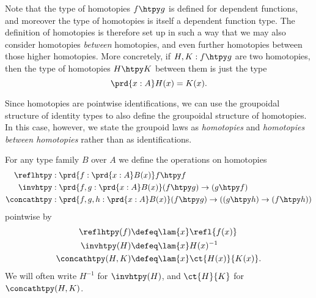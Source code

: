 Note that the type of homotopies $f\htpy g$ is defined for dependent functions, and moreover the type of homotopies is itself a dependent function type. The definition of homotopies is therefore set up in such a way that we may also consider homotopies \emph{between} homotopies, and even further homotopies between those higher homotopies. More concretely, if $H,K:f\htpy g$ are two homotopies, then the type of homotopies $H\htpy K$ between them is just the type
\begin{equation*}
\prd{x:A} H(x)=K(x).
\end{equation*}

Since homotopies are pointwise identifications, we can use the groupoidal structure of identity types to also define the groupoidal structure of homotopies. In this case, however, we state the groupoid laws as \emph{homotopies} and \emph{homotopies between homotopies} rather than as identifications.

\begin{defn}\label{defn:htpy_groupoid}
  For any type family $B$ over $A$ we define the operations on homotopies
  \begin{align*}
    \reflhtpy & : \prd{f:\prd{x:A}B(x)}f\htpy f \\
    \invhtpy & : \prd{f,g:\prd{x:A}B(x)} (f\htpy g)\to(g\htpy f) \\
    \concathtpy & : \prd{f,g,h:\prd{x:A}B(x)} (f\htpy g)\to ((g\htpy h)\to (f\htpy h))
  \end{align*}
  pointwise by
  \begin{align*}
    \reflhtpy(f) & \defeq \lam{x} \refl{f(x)} \\
    \invhtpy(H) & \defeq \lam{x} H(x)^{-1} \\
    \concathtpy(H,K) & \defeq \lam{x}\ct{H(x)}{K(x)}.
  \end{align*}
  We will often write $H^{-1}$ for $\invhtpy(H)$, and $\ct{H}{K}$ for $\concathtpy(H,K)$.
\end{defn}

